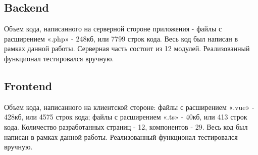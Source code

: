 \documentclass[../../Отчет.tex]{subfiles}
\begin{document}
\subsection{Backend}
\par
Объем кода, написанного на серверной стороне приложения - файлы с расширением «.php» - 248кб, или 7799 строк кода. Весь код был написан в рамках данной работы. Серверная часть состоит из 12 модулей. Реализованный функционал тестировался вручную.  
\subsection{Frontend}
\par
Объем кода, написанного на клиентской стороне: файлы с расширением «.vue» - 428кб, или 4575 строк кода; файлы с расширением «.ts» - 40кб, или 413 строк кода. Количество разработанных страниц - 12, компонентов - 29. Весь код был написан в рамках данной работы. Реализованный функционал тестировался вручную.
\clearpage
\end{document}
